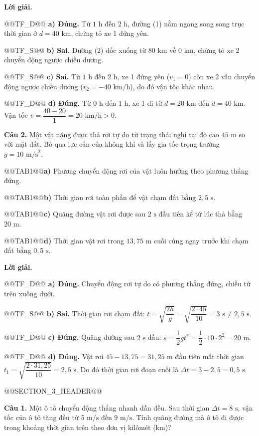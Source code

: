 \documentclass{article}
\begin{document}
\textbf{Lời giải.}

@@TF_D@@ \textbf{a) Đúng.} Từ $1\text{ h}$ đến $2\text{ h}$, đường (1) nằm ngang song song trục thời gian ở $d = 40\text{ km}$, chứng tỏ xe 1 đứng yên.

@@TF_S@@ \textbf{b) Sai.} Đường (2) dốc xuống từ $80\text{ km}$ về $0\text{ km}$, chứng tỏ xe 2 chuyển động ngược chiều dương.

@@TF_S@@ \textbf{c) Sai.} Từ $1\text{ h}$ đến $2\text{ h}$, xe 1 đứng yên ($v_1 = 0$) còn xe 2 vẫn chuyển động ngược chiều dương ($v_2 = -40\text{ km/h}$), do đó vận tốc khác nhau.

@@TF_D@@ \textbf{d) Đúng.} Từ $0\text{ h}$ đến $1\text{ h}$, xe 1 đi từ $d = 20\text{ km}$ đến $d = 40\text{ km}$. Vận tốc $v = \dfrac{40 - 20}{1} = 20\text{ km/h} > 0$.

\textbf{Câu 2.} Một vật nặng được thả rơi tự do từ trạng thái nghỉ tại độ cao $45\text{ m}$ so với mặt đất. Bỏ qua lực cản của không khí và lấy gia tốc trọng trường $g = 10\text{ m/s}^2$.

@@TAB1@@\textbf{a)} Phương chuyển động rơi của vật luôn hướng theo phương thẳng đứng.

@@TAB1@@\textbf{b)} Thời gian rơi toàn phần để vật chạm đất bằng $2{,}5\text{ s}$.

@@TAB1@@\textbf{c)} Quãng đường vật rơi được sau $2\text{ s}$ đầu tiên kể từ lúc thả bằng $20\text{ m}$.

@@TAB1@@\textbf{d)} Thời gian vật rơi trong $13{,}75\text{ m}$ cuối cùng ngay trước khi chạm đất bằng $0{,}5\text{ s}$.

\textbf{Lời giải.}

@@TF_D@@ \textbf{a) Đúng.} Chuyển động rơi tự do có phương thẳng đứng, chiều từ trên xuống dưới.

@@TF_S@@ \textbf{b) Sai.} Thời gian rơi chạm đất: $t = \sqrt{\dfrac{2h}{g}} = \sqrt{\dfrac{2 \cdot 45}{10}} = 3\text{ s} \ne 2{,}5\text{ s}$.

@@TF_D@@ \textbf{c) Đúng.} Quãng đường sau $2\text{ s}$ đầu: $s = \dfrac{1}{2}gt^2 = \dfrac{1}{2} \cdot 10 \cdot 2^2 = 20\text{ m}$.

@@TF_D@@ \textbf{d) Đúng.} Vật rơi $45 - 13{,}75 = 31{,}25\text{ m}$ đầu tiên mất thời gian $t_1 = \sqrt{\dfrac{2 \cdot 31{,}25}{10}} = 2{,}5\text{ s}$. Do đó thời gian rơi đoạn cuối là $\Delta t = 3 - 2{,}5 = 0{,}5\text{ s}$.

@@SECTION_3_HEADER@@

\textbf{Câu 1.} Một ô tô chuyển động thẳng nhanh dần đều. Sau thời gian $\Delta t = 8\text{ s}$, vận tốc của ô tô tăng đều từ $5\text{ m/s}$ đến $9\text{ m/s}$. Tính quãng đường mà ô tô đi được trong khoảng thời gian trên theo đơn vị kilômét (km)?
\end{document}
